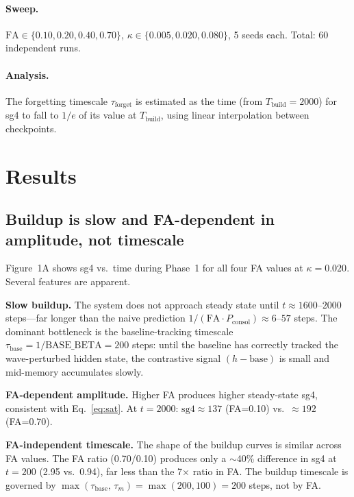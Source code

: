 \documentclass[11pt]{article}
\begin{document}
\paragraph{Sweep.}
$\mathrm{FA} \in \{0.10, 0.20, 0.40, 0.70\}$,
$\kappa \in \{0.005, 0.020, 0.080\}$,
5 seeds each.
Total: 60 independent runs.

\paragraph{Analysis.}
The forgetting timescale $\tau_{\mathrm{forget}}$ is estimated as the time
(from $T_{\mathrm{build}} = 2000$) for sg4 to fall to $1/e$ of its value
at $T_{\mathrm{build}}$, using linear interpolation between checkpoints.

\section{Results}

\subsection{Buildup is slow and FA-dependent in amplitude, not timescale}

Figure~1A shows sg4 vs.\ time during Phase~1 for all four FA values at $\kappa=0.020$.
Several features are apparent.

\textbf{Slow buildup.}
The system does not approach steady state until $t \approx 1600$--$2000$ steps---far longer
than the naive prediction $1/(\mathrm{FA} \cdot P_{\mathrm{consol}}) \approx 6$--$57$ steps.
The dominant bottleneck is the baseline-tracking timescale
$\tau_{\mathrm{base}} = 1/\mathrm{BASE\_BETA} = 200$ steps:
until the baseline has correctly tracked the wave-perturbed hidden state,
the contrastive signal $(h - \mathrm{base})$ is small and mid-memory accumulates slowly.

\textbf{FA-dependent amplitude.}
Higher FA produces higher steady-state sg4, consistent with Eq.~\eqref{eq:sat}.
At $t=2000$: $\mathrm{sg4} \approx 137$ (FA=0.10) vs.\ $\approx 192$ (FA=0.70).

\textbf{FA-independent timescale.}
The shape of the buildup curves is similar across FA values.
The FA ratio (0.70/0.10) produces only a $\sim$40\% difference in sg4 at $t=200$
(2.95 vs.\ 0.94), far less than the 7× ratio in FA.
The buildup timescale is governed by
$\max(\tau_{\mathrm{base}},\,\tau_m) = \max(200, 100) = 200$ steps,
not by FA.
\end{document}
